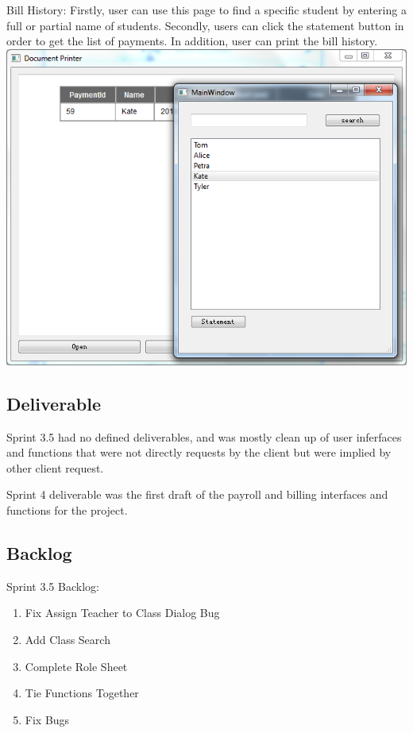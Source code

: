 Bill History:
Firstly, user can use this page to find a specific student by entering a full or partial name of students. Secondly, users can click the statement button in order to get the list of payments. In addition, user can print the bill history.\\

\includegraphics[scale=0.5]{billHistory.png}


\subsection{Deliverable}

Sprint 3.5 had no defined deliverables, and was mostly clean up of user inferfaces and functions that were not directly requests by the client but were implied by other client request.

Sprint 4 deliverable was the first draft of the payroll and billing interfaces and functions for the project.\\


\subsection{Backlog}

Sprint 3.5 Backlog:

\begin{enumerate}
\item Fix Assign Teacher to Class Dialog Bug
\item Add Class Search
\item Complete Role Sheet
\item Tie Functions Together
\item Fix Bugs
\end{enumerate}

